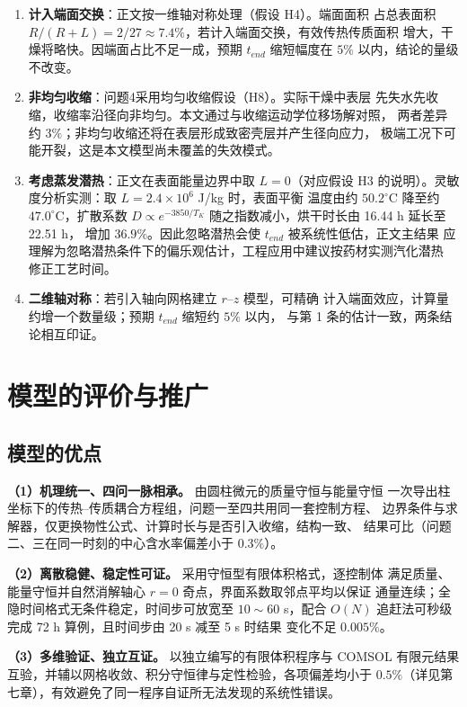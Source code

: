 \documentclass[12pt,a4paper]{article}
\begin{document}
\begin{enumerate}
\item \textbf{计入端面交换}：正文按一维轴对称处理（假设 H4）。端面面积
占总表面积 $R/(R+L)=2/27\approx7.4\%$，若计入端面交换，有效传热传质面积
增大，干燥将略快。因端面占比不足一成，预期 $t_{end}$ 缩短幅度在 $5\%$
以内，结论的量级不改变。
\item \textbf{非均匀收缩}：问题4采用均匀收缩假设（H8）。实际干燥中表层
先失水先收缩，收缩率沿径向非均匀。本文通过与收缩运动学位移场解对照，
两者差异约 $3\%$；非均匀收缩还将在表层形成致密壳层并产生径向应力，
极端工况下可能开裂，这是本文模型尚未覆盖的失效模式。
\item \textbf{考虑蒸发潜热}：正文在表面能量边界中取 $L=0$（对应假设
H3 的说明）。灵敏度分析实测：取 $L=2.4\times10^6$ J/kg 时，表面平衡
温度由约 $50.2^\circ$C 降至约 $47.0^\circ$C，扩散系数 $D\propto
e^{-3850/T_K}$ 随之指数减小，烘干时长由 16.44 h 延长至 22.51 h，
增加 $36.9\%$。因此忽略潜热会使 $t_{end}$ 被系统性低估，正文主结果
应理解为忽略潜热条件下的偏乐观估计，工程应用中建议按药材实测汽化潜热
修正工艺时间。
\item \textbf{二维轴对称}：若引入轴向网格建立 $r$--$z$ 模型，可精确
计入端面效应，计算量约增一个数量级；预期 $t_{end}$ 缩短约 $5\%$ 以内，
与第 1 条的估计一致，两条结论相互印证。
\end{enumerate}
\section{模型的评价与推广}

\subsection{模型的优点}
\textbf{（1）机理统一、四问一脉相承。} 由圆柱微元的质量守恒与能量守恒
一次导出柱坐标下的传热--传质耦合方程组，问题一至四共用同一套控制方程、
边界条件与求解器，仅更换物性公式、计算时长与是否引入收缩，结构一致、
结果可比（问题二、三在同一时刻的中心含水率偏差小于 $0.3\%$）。

\textbf{（2）离散稳健、稳定性可证。} 采用守恒型有限体积格式，逐控制体
满足质量、能量守恒并自然消解轴心 $r=0$ 奇点，界面系数取邻点平均以保证
通量连续；全隐时间格式无条件稳定，时间步可放宽至 $10\sim60$ s，配合
$O(N)$ 追赶法可秒级完成 72 h 算例，且时间步由 20 s 减至 5 s 时结果
变化不足 $0.005\%$。

\textbf{（3）多维验证、独立互证。} 以独立编写的有限体积程序与 COMSOL
有限元结果互验，并辅以网格收敛、积分守恒律与定性检验，各项偏差均小于
$0.5\%$（详见第七章），有效避免了同一程序自证所无法发现的系统性错误。
\end{document}
